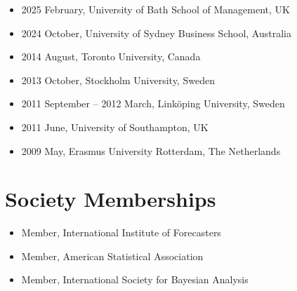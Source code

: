 \documentclass[twoside,a4paper]{article}
\begin{document}
\begin{itemize}
\item 2025 February, University of Bath School of Management, UK
\item 2024 October, University of Sydney Business School, Australia
\item 2014 August, Toronto University, Canada
\item 2013 October, Stockholm University, Sweden
\item 2011 September – 2012 March, Linköping University, Sweden
\item 2011 June, University of Southampton, UK
\item 2009 May, Erasmus University Rotterdam, The Netherlands
\end{itemize}

\section{Society Memberships}

\begin{itemize}
\item Member, International Institute of Forecasters
\item Member, American Statistical Association
\item Member, International Society for Bayesian Analysis
\end{itemize}





\end{document}
